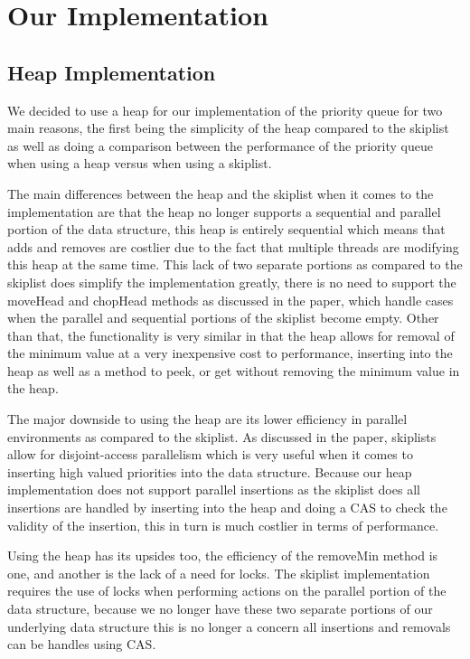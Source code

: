 \documentclass[10pt]{asme2ej}
\begin{document}
\section{Our Implementation}

\subsection{Heap Implementation}
We decided to use a heap for our implementation of the priority queue for two main reasons, the first being the simplicity of the heap compared to the skiplist as well as doing a comparison between the performance of the priority queue when using a heap versus when using a skiplist. 

The main differences between the heap and the skiplist when it comes to the implementation are that the heap no longer supports a sequential and parallel portion of the data structure, this heap is entirely sequential which means that adds and removes are costlier due to the fact that multiple threads are modifying this heap at the same time. This lack of two separate portions as compared to the skiplist does simplify the implementation greatly, there is no need to support the moveHead and chopHead methods as discussed in the paper, which handle cases when the parallel and sequential portions of the skiplist become empty. Other than that, the functionality is very similar in that the heap allows for removal of the minimum value at a very inexpensive cost to performance, inserting into the heap as well as a method to peek, or get without removing the minimum value in the heap.

The major downside to using the heap are its lower efficiency in parallel environments as compared to the skiplist. As discussed in the paper, skiplists allow for disjoint-access parallelism which is very useful when it comes to inserting high valued priorities into the data structure. Because our heap implementation does not support parallel insertions as the skiplist does all insertions are handled by inserting into the heap and doing a CAS to check the validity of the insertion, this in turn is much costlier in terms of performance. 

Using the heap has its upsides too, the efficiency of the removeMin method is one, and another is the lack of a need for locks. The skiplist implementation requires the use of locks when performing actions on the parallel portion of the data structure, because we no longer have these two separate portions of our underlying data structure this is no longer a concern all insertions and removals can be handles using CAS. 
\end{document}
